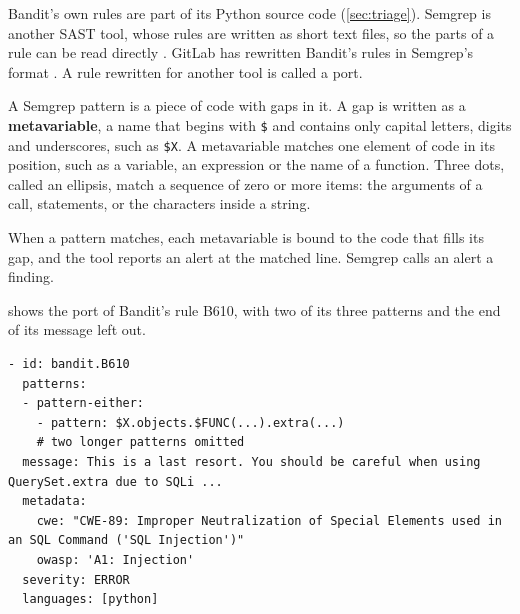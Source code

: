 Bandit's own rules are part of its Python source code (\cref{sec:triage}). Semgrep is another SAST
tool, whose rules are written as short text files, so the parts of a rule can be read directly
\citep{semgrep-rule-syntax}. GitLab has rewritten Bandit's rules in Semgrep's format
\citep{gitlab-semgrep-bandit}. A rule rewritten for another tool is called a port.

A Semgrep pattern is a piece of code with gaps in it. A gap is written as a \textbf{metavariable}, a
name that begins with \texttt{\$} and contains only capital letters, digits and underscores, such as
\texttt{\$X}. A metavariable matches one element of code in its position, such as a variable, an
expression or the name of a function. Three dots, called an ellipsis, match a sequence of zero or
more items: the arguments of a call, statements, or the characters inside a string.

When a pattern matches, each metavariable is bound to the code that fills its gap, and the tool
reports an alert at the matched line. Semgrep calls an alert a finding.

 shows the port of Bandit's rule B610, with two of its three patterns and
the end of its message left out.

\begin{lstlisting}[basicstyle=\ttfamily\footnotesize, caption={Bandit's rule B610 as GitLab ported it to Semgrep, shortened.}, label=lst:discovery-b610]
- id: bandit.B610
  patterns:
  - pattern-either:
    - pattern: $X.objects.$FUNC(...).extra(...)
    # two longer patterns omitted
  message: This is a last resort. You should be careful when using QuerySet.extra due to SQLi ...
  metadata:
    cwe: "CWE-89: Improper Neutralization of Special Elements used in an SQL Command ('SQL Injection')"
    owasp: 'A1: Injection'
  severity: ERROR
  languages: [python]
\end{lstlisting}

